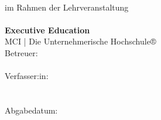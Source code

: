 \begin{titlepage}
    \centering
    {\fontsize{20pt}{26pt}\selectfont \textbf{\ThesisTitle}}\\[2cm]
    {\large im Rahmen der Lehrveranstaltung}\\[0cm]
    {\large \textbf{\Module}}\\[1cm]
    {\large\textbf{Executive Education}\\[0cm] MCI | Die Unternehmerische Hochschule®}\\[7cm]
    {\large Betreuer: \textbf{\\[0cm]\Supervisor}}\\[2cm]
     {\large Verfasser:in: \textbf{\\[0cm]\AuthorName \\[0cm]\MatriculationNumber}} \\[2cm]
    {\large Abgabedatum: \\[0cm]\textbf{\SubmissionDate}}\\[2cm]
\end{titlepage}